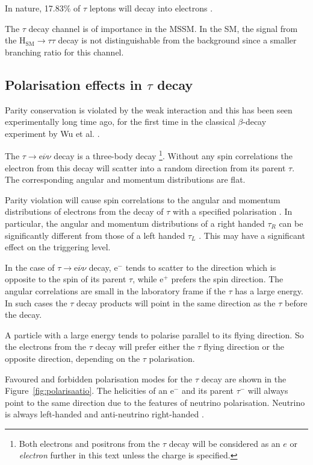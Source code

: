 \documentclass[a4paper,12pt,titlepage]{article}
\begin{document}
In nature, 17.83$\%$ of $\tau$ leptons will decay into electrons \cite{vakiot}. 

The $\tau$ decay channel is of importance in the MSSM. In the SM, the signal from the $\mathrm{H_{SM}} \rightarrow \tau \tau$ decay is not distinguishable from the background since a smaller branching ratio for this channel.   

\subsection{Polarisation effects in $\tau$ decay}
Parity conservation is violated by the weak interaction and this has been seen experimentally long time ago, for the first time in the classical $\beta$-decay experiment by Wu et al. \cite{betadecPNC}. 

The $\tau \rightarrow \mathrm{e} \overline{\nu} \nu$ decay is a three-body decay \footnote[1]{Both electrons and positrons from the $\tau$ decay will be considered as an $e$ or \emph{electron} further in this text unless the charge is specified.}. Without any spin correlations the electron from this decay will scatter into a random direction from its parent $\tau$. The corresponding angular and momentum distributions are flat. 

Parity violation will cause spin correlations to the angular and momentum distributions of electrons from the decay of $\tau$ with a specified polarisation \cite{TauGrotzPP}. In particular, the angular and momentum distributions of a right handed $\tau_R$ can be significantly different from those of a left handed $\tau_L$ \cite{taupolarisation}. This may have a significant effect on the triggering level. 

In the case of $\tau \rightarrow \mathrm{e} \overline{\nu} \nu$ decay, $\mathrm{e^-}$ tends to scatter to the direction which is opposite to the spin of its parent $\tau$, while $\mathrm{e^+}$ prefers the spin direction. The angular correlations are small in the laboratory frame if the $\tau$ has a large energy. In such cases the $\tau$ decay products will point in the same direction as the $\tau$ before the decay.
 
A particle with a large energy tends to polarise parallel to its flying direction. So the electrons from the $\tau$ decay will prefer either the $\tau$ flying direction or the opposite direction, depending on the $\tau$ polarisation.

Favoured and forbidden polarisation modes for the $\tau$ decay are shown in the Figure~\ref{fig:polarisaatio}. The helicities of an $\mathrm{e^-}$ and its parent $\tau^-$ will always point to the same direction due to the features of neutrino polarisation. Neutrino is always left-handed and anti-neutrino right-handed \cite{Tsai}.
\end{document}

